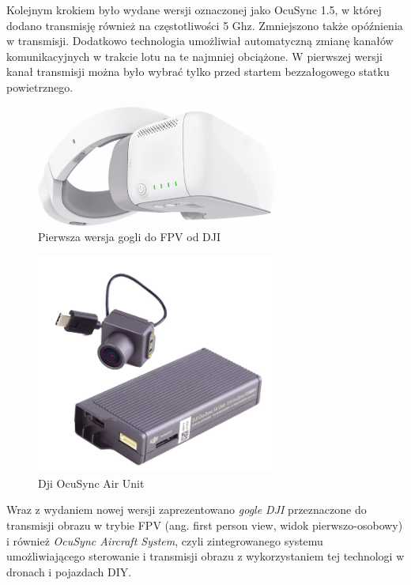 Kolejnym krokiem było wydane wersji oznaczonej jako OcuSync 1.5, w której dodano transmisję również na częstotliwości 5 Ghz. Zmniejszono także opóźnienia w transmisji. Dodatkowo technologia umożliwiał automatyczną zmianę kanałów komunikacyjnych w trakcie lotu na te najmniej obciążone. W pierwszej wersji kanał
transmisji można było wybrać tylko przed startem bezzałogowego statku powietrznego.\cite{ocusync-yt}


\begin{figure}[!ht]
\begin{center}
  \includegraphics[width=8cm]{./Obrazy/dji-google.png}
  \caption{Pierwsza wersja gogli do FPV od DJI}
  \end{center}
\end{figure}

  
  
\begin{figure}[!ht]
\begin{center}
  \includegraphics[width=8cm]{./Obrazy/dji-air-unit.png}
  \caption{Dji OcuSync Air Unit}
  \end{center}
\end{figure}


Wraz z wydaniem nowej wersji zaprezentowano \textit{gogle DJI} przeznaczone do transmisji obrazu w trybie FPV (ang. first person view, widok pierwszo-osobowy) i również \textit{OcuSync Aircraft System}, czyli zintegrowanego systemu umożliwiającego sterowanie i transmisji obrazu z wykorzystaniem tej technologi w dronach i pojazdach DIY.


